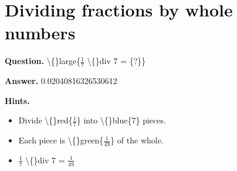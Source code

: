 \documentclass{article}
\begin{document}
\section*{Dividing fractions by whole numbers}
\textbf{Question.} \textbackslash\{\}large\{$\frac{1}{7}$ \textbackslash\{\}div 7 = \{?\}\}

\textbf{Answer.} 0.02040816326530612

\textbf{Hints.}
\begin{itemize}
  \item Divide \textbackslash\{\}red\{$\frac{1}{7}$\} into \textbackslash\{\}blue\{7\} pieces.
  \item Each piece is \textbackslash\{\}green\{$\frac{1}{49}$\} of the whole.
  \item $\frac{1}{7}$ \textbackslash\{\}div 7 = $\frac{1}{49}$
\end{itemize}
\end{document}
